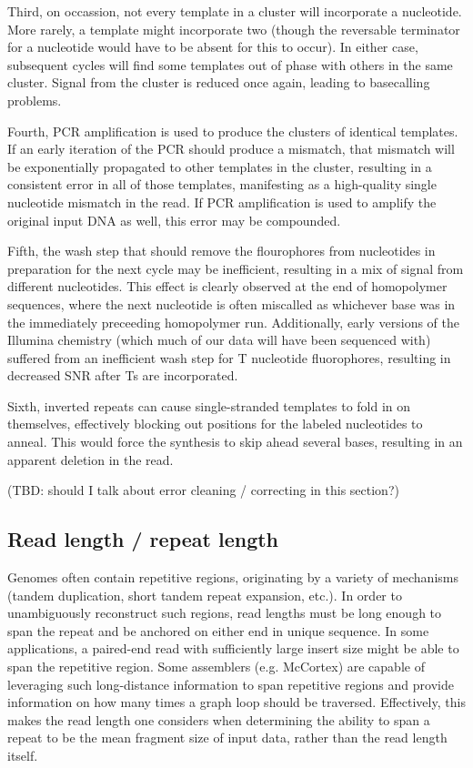 Third, on occassion, not every template in a cluster will incorporate a nucleotide.  More rarely, a template might incorporate two (though the reversable terminator for a nucleotide would have to be absent for this to occur).  In either case, subsequent cycles will find some templates out of phase with others in the same cluster.  Signal from the cluster is reduced once again, leading to basecalling problems.

Fourth, PCR amplification is used to produce the clusters of identical templates.  If an early iteration of the PCR should produce a mismatch, that mismatch will be exponentially propagated to other templates in the cluster, resulting in a consistent error in all of those templates, manifesting as a high-quality single nucleotide mismatch in the read.  If PCR amplification is used to amplify the original input DNA as well, this error may be compounded.

Fifth, the wash step that should remove the flourophores from nucleotides in preparation for the next cycle may be inefficient, resulting in a mix of signal from different nucleotides.  This effect is clearly observed at the end of homopolymer sequences, where the next nucleotide is often miscalled as whichever base was in the immediately preceeding homopolymer run.  Additionally, early versions of the Illumina chemistry (which much of our data will have been sequenced with) suffered from an inefficient wash step for T nucleotide fluorophores, resulting in decreased SNR after Ts are incorporated.

Sixth, inverted repeats can cause single-stranded templates to fold in on themselves, effectively blocking out positions for the labeled nucleotides to anneal.  This would force the synthesis to skip ahead several bases, resulting in an apparent deletion in the read.

(TBD: should I talk about error cleaning / correcting in this section?)

\subsection{Read length / repeat length}

Genomes often contain repetitive regions, originating by a variety of mechanisms (tandem duplication, short tandem repeat expansion, etc.).  In order to unambiguously reconstruct such regions, read lengths must be long enough to span the repeat and be anchored on either end in unique sequence.  In some applications, a paired-end read with sufficiently large insert size might be able to span the repetitive region.  Some assemblers (e.g. McCortex) are capable of leveraging such long-distance information to span repetitive regions and provide information on how many times a graph loop should be traversed.  Effectively, this makes the read length one considers when determining the ability to span a repeat to be the mean fragment size of input data, rather than the read length itself.

